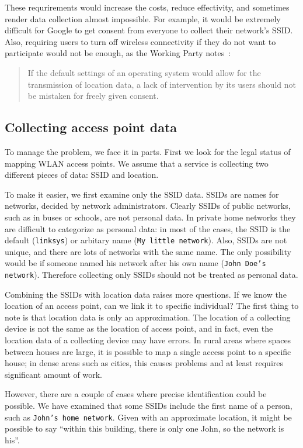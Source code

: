 \documentclass[12pt,a4paper,oneside,pdftex]{report}
\begin{document}
These requrirements would increase the costs, reduce effectivity, and sometimes render data collection almost impossible. For example, it would be extremely difficult for Google to get consent from everyone to collect their network's SSID. Also, requiring users to turn off wireless connectivity if they do not want to participate would not be enough, as the Working Party notes~\cite{wp29_185}:
\begin{quote}
    If the default settings of an operating system would allow for the transmission of location data, a lack of intervention by its users should not be mistaken for freely given consent.
\end{quote}


\subsection{Collecting access point data}
\label{subsec:eu_collect}

To manage the problem, we face it in parts. First we look for the legal status of mapping WLAN access points. We assume that a service is collecting two different pieces of data: SSID and location.

To make it easier, we first examine only the SSID data. SSIDs are names for networks, decided by network administrators. Clearly SSIDs of public networks, such as in buses or schools, are not personal data. In private home networks they are difficult to categorize as personal data: in most of the cases, the SSID is the default (\texttt{linksys}) or arbitary name (\texttt{My little network}). Also, SSIDs are not unique, and there are lots of networks with the same name. The only possibility would be if someone named his network after his own name (\texttt{John Doe's network}). Therefore collecting only SSIDs should not be treated as personal data.

Combining the SSIDs with location data raises more questions. If we know the location of an access point, can we link it to specific individual? The first thing to note is that location data is only an approximation. The location of a collecting device is not the same as the location of access point, and in fact, even the location data of a collecting device may have errors. In rural areas where spaces between houses are large, it is possible to map a single access point to a specific house; in dense areas such as cities, this causes problems and at least requires significant amount of work.

However, there are a couple of cases where precise identification could be possible. We have examined that some SSIDs include the first name of a person, such as \texttt{John's home network}. Given with an approximate location, it might be possible to say ``within this building, there is only one John, so the network is his''. 
\end{document}
